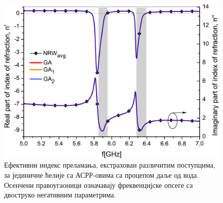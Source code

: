 \begin{figure}[!t]
\centering
\includegraphics[scale=\SkalaB]{slike/8b.pdf}
\caption{Ефективни индекс преламања, екстрахован различитим поступцима, за јединичне ћелије са АСРР-овима са процепом даље од вода. Осенчени правоугаоници означавају фреквенцијске опсеге са двоструко негативним параметрима.}
\label{fig8b}
\end{figure} 

